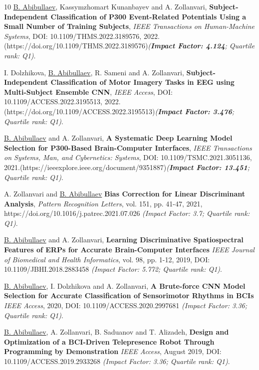 \documentclass[10pt,letterpaper,sans]{moderncv}   %
\begin{document}
\label{publication}
\begin{thebibliography}{10}
	\small 
	\underline{B. Abibullaev}, Kassymzhomart Kunanbayev and A. Zollanvari,
	\newblock \textbf{Subject-Independent Classification of P300 Event-Related Potentials Using a Small Number of Training Subjects},
	\newblock \textit{IEEE Transactions on Human-Machine Systems}, DOI: 10.1109/THMS.2022.3189576, 2022.(https://doi.org/10.1109/THMS.2022.3189576)\textit{(\textbf{Impact Factor: 4.124}; Quartile rank: Q1)}.
	
	\small 
	I. Dolzhikova, \underline{B. Abibullaev}, R. Sameni  and A. Zollanvari,
	\newblock \textbf{Subject-Independent Classification of Motor Imagery Tasks in EEG using Multi-Subject Ensemble CNN},
	\newblock \textit{IEEE Access}, DOI: 10.1109/ACCESS.2022.3195513, 2022.(https://doi.org/10.1109/ACCESS.2022.3195513)\textit{(\textbf{Impact Factor: 3.476}; Quartile rank: Q1)}.
	
	\small 
	\underline{B. Abibullaev} and A. Zollanvari,
	\newblock \textbf{A Systematic Deep Learning Model Selection for P300-Based Brain-Computer Interfaces},
	\newblock \textit{IEEE Transactions on Systems, Man, and Cybernetics: Systems}, DOI: 10.1109/TSMC.2021.3051136, 2021.(https://ieeexplore.ieee.org/document/9351887)\textit{(\textbf{Impact Factor: 13.451}; Quartile rank: Q1)}.
	
	\small 
	A. Zollanvari and \underline{B. Abibullaev}
	\newblock \textbf{Bias Correction for Linear Discriminant Analysis},
	\newblock \textit{Pattern Recognition Letters}, vol. 151, pp. 41-47, 2021, https://doi.org/10.1016/j.patrec.2021.07.026 \textit{(Impact Factor: 3.7; Quartile rank: Q1)}.
	
	\small 
	\underline{B. Abibullaev} and A. Zollanvari,
	\newblock \textbf{Learning Discriminative Spatiospectral Features of ERPs for Accurate Brain-Computer Interfaces}
	\newblock \textit{IEEE Journal of Biomedical and Health Informatics}, vol. 98, pp. 1-12, 2019, DOI: 10.1109/JBHI.2018.2883458 \textit{(Impact Factor: 5.772; Quartile rank: Q1)}.
	
	\small 
	\underline{B. Abibullaev}, I. Dolzhikova and A. Zollanvari, 
	\newblock \textbf{A Brute-force CNN Model Selection for Accurate Classification of Sensorimotor Rhythms in BCIs} \newblock \textit{IEEE Access}, 2020,  DOI: 10.1109/ACCESS.2020.2997681
	\textit{(Impact Factor: 3.36; Quartile rank: Q1)}.
	
	
	\small 
	\underline{B. Abibullaev}, A. Zollanvari, B. Saduanov and T. Alizadeh, 
	\newblock \textbf{Design and Optimization of a BCI-Driven Telepresence Robot Through Programming by Demonstration}
	\newblock \textit{IEEE Access}, August 2019,  DOI: 10.1109/ACCESS.2019.2933268
	\textit{(Impact Factor: 3.36; Quartile rank: Q1)}.
	

\end{thebibliography}
\end{document}
